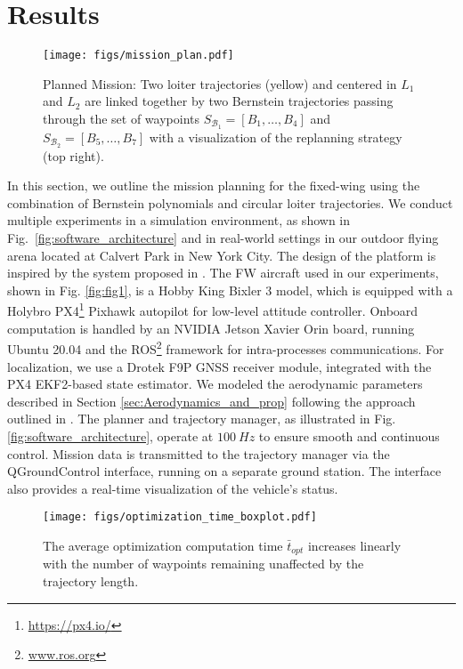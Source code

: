 \section{Results}
\label{sec:Experimental_Results}


\begin{figure}[!t]
  \centering
  \texttt{[image: figs/mission\_plan.pdf]}
  \caption{Planned Mission: Two loiter trajectories (yellow) and centered in $L_1$ and $L_2$ are linked together by two Bernstein trajectories passing through the set of waypoints $S_{\mathcal{B}_1} = [B_1, \dots, B_4]$ and $S_{\mathcal{B}_2} =[B_5, \dots, B_7]$ with a visualization of the replanning strategy (top right). 
  \label{fig:planned_mission}}
  \vspace{-10pt}
\end{figure}


In this section, we outline the mission planning for the fixed-wing using the combination of Bernstein polynomials and circular loiter trajectories. We conduct multiple experiments in a simulation environment, as shown in Fig.~\ref{fig:software_architecture} and in real-world settings in our outdoor flying arena located at Calvert Park in New York City. The design of the platform is inspired by the system proposed in \cite{wuest2022accurate}. The FW aircraft used in our experiments, shown in Fig. \ref{fig:fig1}, is a Hobby King Bixler 3 model, which is equipped with a Holybro\textsuperscript{{\textregistered}} PX4\footnote{\url{https://px4.io/}} Pixhawk autopilot for low-level attitude controller. Onboard computation is handled by an NVIDIA\textsuperscript{{\textregistered}} Jetson Xavier Orin board, running Ubuntu 20.04 and the ROS\footnote{\url{www.ros.org}} framework for intra-processes communications. For localization, we use a Drotek\textsuperscript{{\textregistered}} F9P GNSS receiver module, integrated with the PX4 EKF2-based state estimator.
We modeled the aerodynamic parameters described in Section \ref{sec:Aerodynamics_and_prop} following the approach outlined in \cite{Beard_book}. The planner and trajectory manager, as illustrated in Fig. \ref{fig:software_architecture}, operate at $100~\si{Hz}$ to ensure smooth and continuous control. Mission data is transmitted to the trajectory manager via the QGroundControl\textsuperscript{{\textregistered}} interface, running on a separate ground station. The interface also provides a real-time visualization of the vehicle’s status. %

\begin{figure}[!t]
  \centering
  \texttt{[image: figs/optimization\_time\_boxplot.pdf]}
  \caption{The average optimization computation time $\bar{t}_{opt}$ increases linearly with the number of waypoints remaining unaffected by the trajectory length.
  \label{fig:optimization_time}}
  \vspace{-20pt}
\end{figure}

